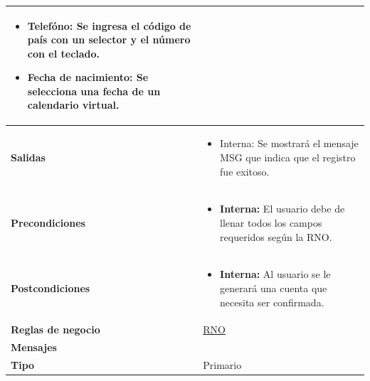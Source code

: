 \begin{center}
\begin{longtable}{| p{3.5cm} | p{11.5cm} |}
\begin{itemize}
              \item \textbf{Telefóno}: Se ingresa el código de país con un selector y el número con el teclado.
              \item \textbf{Fecha de nacimiento}: Se selecciona una fecha de un calendario virtual.
            \end{itemize} \\
        \hline	
          \textbf{Salidas} &  
          \begin{itemize}
              \item Interna: Se mostrará el mensaje MSG que indica que el registro fue exitoso.
            \end{itemize} \\
        \hline	
          \textbf{Precondiciones}& 
            \begin{itemize}
              \item \textbf{Interna:} El usuario debe de llenar todos los campos requeridos según la RNO.
            \end{itemize} \\
        \hline	
          \textbf{Postcondiciones} & 
            \begin{itemize}
              \item \textbf{Interna:} Al usuario se le generará una cuenta que necesita ser confirmada.
            \end{itemize} \\
        \hline    
           \textbf{Reglas de negocio} & \hyperref[]{RNO}\\
        \hline
           \textbf{Mensajes} & \\
        \hline
           \textbf{Tipo} & Primario \\
        \hline	    
  \end{longtable}
\end{center}
\endgroup

